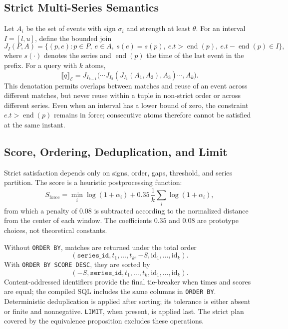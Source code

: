 \documentclass[11pt,a4paper]{article}
\newcommand{\Events}{\mathcal{E}}
\newcommand{\Den}[1]{\llbracket #1\rrbracket}
\newcommand{\code}[1]{\texttt{#1}}
\begin{document}
\subsection{Strict Multi-Series Semantics}

Let $A_i$ be the set of events with sign $\sigma_i$ and strength at least $\theta$. For an interval $I=[l,u]$, define the bounded join
\begin{equation}
J_I(P,A)=\{(p,e):p\in P,\ e\in A,\ s(e)=s(p),\ e.t>\operatorname{end}(p),\ e.t-\operatorname{end}(p)\in I\},
\end{equation}
where $s(\cdot)$ denotes the series and $\operatorname{end}(p)$ the time of the last event in the prefix. For a query with $k$ atoms,
\begin{equation}
\Den{q}_{\Events}=J_{I_{k-1}}\bigl(\cdots J_{I_2}(J_{I_1}(A_1,A_2),A_3)\cdots,A_k\bigr).
\end{equation}
This denotation permits overlaps between matches and reuse of an event across different matches, but never reuse within a tuple in non-strict order or across different series. Even when an interval has a lower bound of zero, the constraint $e.t>\operatorname{end}(p)$ remains in force; consecutive atoms therefore cannot be satisfied at the same instant.

\subsection{Score, Ordering, Deduplication, and Limit}

Strict satisfaction depends only on signs, order, gaps, threshold, and series partition. The score is a heuristic postprocessing function:
\begin{equation}
 S_{\mathrm{force}}=\min_i\log(1+\alpha_i)
 +0.35\,\frac{1}{k}\sum_i\log(1+\alpha_i),
\end{equation}
from which a penalty of $0.08$ is subtracted according to the normalized distance from the center of each window. The coefficients $0.35$ and $0.08$ are prototype choices, not theoretical constants.

Without \code{ORDER BY}, matches are returned under the total order
\begin{equation*}
 (\code{series\_id},t_1,\ldots,t_k,-S,\mathrm{id}_1,\ldots,\mathrm{id}_k).
\end{equation*}
With \code{ORDER BY SCORE DESC}, they are sorted by
\begin{equation*}
 (-S,\code{series\_id},t_1,\ldots,t_k,\mathrm{id}_1,\ldots,\mathrm{id}_k).
\end{equation*}
Content-addressed identifiers provide the final tie-breaker when times and scores are equal; the compiled SQL includes the same columns in \code{ORDER BY}. Deterministic deduplication is applied after sorting; its tolerance is either absent or finite and nonnegative. \code{LIMIT}, when present, is applied last. The strict plan covered by the equivalence proposition excludes these operations.
\end{document}
